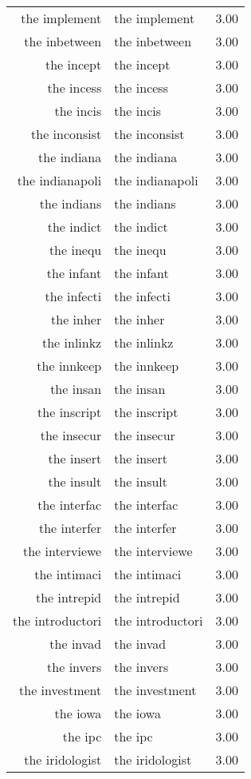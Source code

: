 \begin{table}[ht]
\begin{tabular}{rlr}
  the implement & the implement & 3.00 \\ 
  the inbetween & the inbetween & 3.00 \\ 
  the incept & the incept & 3.00 \\ 
  the incess & the incess & 3.00 \\ 
  the incis & the incis & 3.00 \\ 
  the inconsist & the inconsist & 3.00 \\ 
  the indiana & the indiana & 3.00 \\ 
  the indianapoli & the indianapoli & 3.00 \\ 
  the indians & the indians & 3.00 \\ 
  the indict & the indict & 3.00 \\ 
  the inequ & the inequ & 3.00 \\ 
  the infant & the infant & 3.00 \\ 
  the infecti & the infecti & 3.00 \\ 
  the inher & the inher & 3.00 \\ 
  the inlinkz & the inlinkz & 3.00 \\ 
  the innkeep & the innkeep & 3.00 \\ 
  the insan & the insan & 3.00 \\ 
  the inscript & the inscript & 3.00 \\ 
  the insecur & the insecur & 3.00 \\ 
  the insert & the insert & 3.00 \\ 
  the insult & the insult & 3.00 \\ 
  the interfac & the interfac & 3.00 \\ 
  the interfer & the interfer & 3.00 \\ 
  the interviewe & the interviewe & 3.00 \\ 
  the intimaci & the intimaci & 3.00 \\ 
  the intrepid & the intrepid & 3.00 \\ 
  the introductori & the introductori & 3.00 \\ 
  the invad & the invad & 3.00 \\ 
  the invers & the invers & 3.00 \\ 
  the investment & the investment & 3.00 \\ 
  the iowa & the iowa & 3.00 \\ 
  the ipc & the ipc & 3.00 \\ 
  the iridologist & the iridologist & 3.00 \\ 

\end{tabular}
\end{table}
